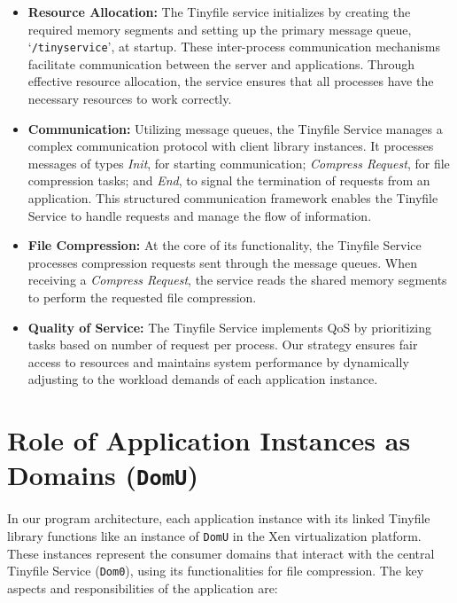 \documentclass[12pt]{article}
\begin{document}
\begin{itemize}
    \item \textbf{Resource Allocation:} The Tinyfile service initializes by creating the required memory segments and setting up the primary message queue, `\texttt{/tinyservice}', at startup. These inter-process communication mechanisms facilitate communication between the server and applications. Through effective resource allocation, the service ensures that all processes have the necessary resources to work correctly.

    \item \textbf{Communication:} Utilizing message queues, the Tinyfile Service manages a complex communication protocol with client library instances. It processes messages of types \textit{Init}, for starting communication; \textit{Compress Request}, for file compression tasks; and \textit{End}, to signal the termination of requests from an application. This structured communication framework enables the Tinyfile Service to handle requests and manage the flow of information.
    
    \item \textbf{File Compression:} At the core of its functionality, the Tinyfile Service processes compression requests sent through the message queues. When receiving a \textit{Compress Request}, the service reads the shared memory segments to perform the requested file compression.
    
    \item \textbf{Quality of Service:} The Tinyfile Service implements QoS by prioritizing tasks based on number of request per process. Our strategy ensures fair access to resources and maintains system performance by dynamically adjusting to the workload demands of each application instance.
\end{itemize}


\section*{Role of Application Instances as Domains (\texttt{DomU})}
In our program architecture, each application instance with its linked Tinyfile library functions like an instance of \texttt{DomU} in the Xen virtualization platform. These instances represent the consumer domains that interact with the central Tinyfile Service (\texttt{Dom0}), using its functionalities for file compression. The key aspects and responsibilities of the application are:
\end{document}
